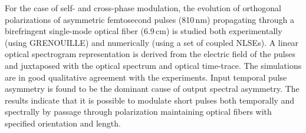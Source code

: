 For the case of self- and cross-phase modulation, the evolution of orthogonal polarizations of asymmetric femtosecond pulses (810\,nm) propagating through  a birefringent single-mode optical fiber (6.9\,cm) is studied both experimentally (using GRENOUILLE) and numerically (using a set of coupled NLSEs). A linear optical spectrogram representation is derived from the electric field of the pulses and juxtaposed with the optical spectrum and optical time-trace. The simulations are
in good qualitative agreement with the experiments. Input temporal pulse asymmetry is found to be the dominant cause of output spectral asymmetry. The results indicate that it is possible to modulate short pulses both temporally and spectrally by passage through polarization maintaining optical fibers with specified orientation and length.
